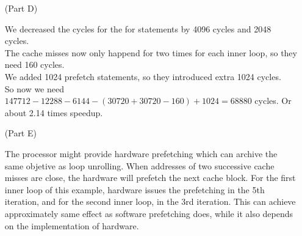 \documentclass[11pt,leqno]{article}
\begin{document}
\begin{enumerate}
\begin{verbatim}
\end{verbatim}

\item[(Part D)]

We decreased the cycles for the for statements by 4096 cycles and 2048 cycles.\\
The cache misses now only happend for two times for each inner loop, so they need 160 cycles.\\
We added 1024 prefetch statements, so they introduced extra 1024 cycles.\\
So now we need $147712 - 12288 - 6144 - (30720 + 30720 - 160) + 1024 = 68880$ cycles. Or about 2.14 times speedup.

\item[(Part E)]

The processor might provide hardware prefetching which can archive the same objetive as loop unrolling. When addresses of two successive cache misses are close, the hardware will prefetch the next cache block. For the first inner loop of this example, hardware issues the prefetching in the 5th iteration, and for the second inner loop, in the 3rd iteration. This can achieve approximately same effect as software prefetching does, while it also depends on the implementation of hardware.

\end{enumerate}
\end{document}
